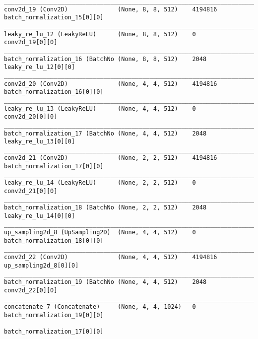 \begin{verbatim}
__________________________________________________________________________________________________
conv2d_19 (Conv2D)              (None, 8, 8, 512)    4194816     batch_normalization_15[0][0]     
__________________________________________________________________________________________________
leaky_re_lu_12 (LeakyReLU)      (None, 8, 8, 512)    0           conv2d_19[0][0]                  
__________________________________________________________________________________________________
batch_normalization_16 (BatchNo (None, 8, 8, 512)    2048        leaky_re_lu_12[0][0]             
__________________________________________________________________________________________________
conv2d_20 (Conv2D)              (None, 4, 4, 512)    4194816     batch_normalization_16[0][0]     
__________________________________________________________________________________________________
leaky_re_lu_13 (LeakyReLU)      (None, 4, 4, 512)    0           conv2d_20[0][0]                  
__________________________________________________________________________________________________
batch_normalization_17 (BatchNo (None, 4, 4, 512)    2048        leaky_re_lu_13[0][0]             
__________________________________________________________________________________________________
conv2d_21 (Conv2D)              (None, 2, 2, 512)    4194816     batch_normalization_17[0][0]     
__________________________________________________________________________________________________
leaky_re_lu_14 (LeakyReLU)      (None, 2, 2, 512)    0           conv2d_21[0][0]                  
__________________________________________________________________________________________________
batch_normalization_18 (BatchNo (None, 2, 2, 512)    2048        leaky_re_lu_14[0][0]             
__________________________________________________________________________________________________
up_sampling2d_8 (UpSampling2D)  (None, 4, 4, 512)    0           batch_normalization_18[0][0]     
__________________________________________________________________________________________________
conv2d_22 (Conv2D)              (None, 4, 4, 512)    4194816     up_sampling2d_8[0][0]            
__________________________________________________________________________________________________
batch_normalization_19 (BatchNo (None, 4, 4, 512)    2048        conv2d_22[0][0]                  
__________________________________________________________________________________________________
concatenate_7 (Concatenate)     (None, 4, 4, 1024)   0           batch_normalization_19[0][0]     
                                                                 batch_normalization_17[0][0]     

\end{verbatim}
